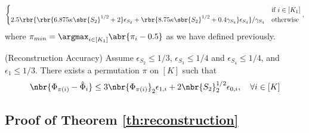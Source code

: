 \documentclass[twoside,11pt]{article}
\begin{document}
{\begin{align*}
\begin{cases}
& \text{if}\,\,i \in [K_1]\\
                          2.5 \rbr{\rbr{6.875 \kappa \sbr{S_2}^{1/2}+2 } \epsilon_{S_2} + \rbr{ 8.75 \kappa \sbr{S_2}^{1/2} + 0.4 \gamma_{S_4} } \epsilon_{S_4}}/\gamma_{S_4}    & \text{otherwise} \end{cases},
\end{align*}
where $\pi_{min} = \argmax_{i \in [K_1]} \abr{\pi_i - 0.5}$ as we have defined previously.
\begin{lemma}{(Reconstruction Accuracy)}
  \label{lem:overall}
 Assume $\epsilon_{S_2} \leq 1/3$, $\epsilon_{S_3} \leq 1/4$ and $\epsilon_{S_4} \leq 1/4$, and $\epsilon_1 \leq 1/3$. There exists a permutation $\pi$ on $[K]$ such that
  \begin{align*}
      \nbr{\Phi_{\pi(i)} - \hat{\Phi}_i } \leq 3 \nbr{\Phi_{\pi(i)} }_2 \epsilon_{1,i} + 2 \nbr{S_2}_2^{1/2} \epsilon_{0,i},\,\,\,\,\,\,   \forall i \in [K]
  \end{align*}
\end{lemma}

\subsection{Proof of Theorem \ref{th:reconstruction}}

}
\end{document}
